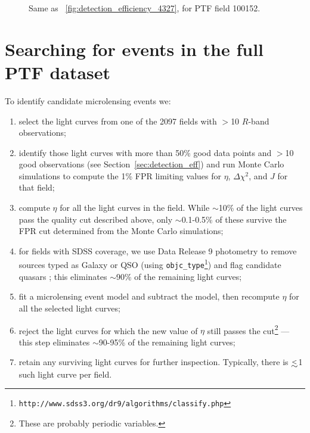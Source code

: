 \documentclass{emulateapj}
\newcommand{\lapprox }{{\lower0.8ex\hbox{$\buildrel <\over\sim$}}}
\begin{document}
\begin{figure}
\centering
	
\caption{Same as \figurename~\ref{fig:detection_efficiency_4327}, for PTF field 100152.}\label{fig:detection_efficiency_100152}
\end{figure}

\section{Searching for events in the full PTF dataset}\label{sec:search}
To identify candidate microlensing events we: %
\begin{enumerate}
	\item select the light curves from one of the 2097 fields with $>$10 $R$-band observations;
	\item identify those light curves with more than 50\% good data points and $>$10 good observations (see Section~\ref{sec:detection_eff}) and run Monte Carlo simulations to compute the 1\% FPR limiting values for $\eta$, $\Delta \chi^2$, and $J$ for that field;
	\item compute $\eta$ for all the light curves in the field. While $\sim$10\% of the light curves pass the quality cut described above, only $\sim$0.1-0.5\% of these survive the FPR cut determined from the Monte Carlo simulations;
	\item for fields with SDSS coverage, we use Data Release 9 photometry \citep{dr9paper} to remove sources typed as Galaxy or QSO (using \texttt{objc\_type}\footnote{{\tt http://www.sdss3.org/dr9/algorithms/classify.php}}) and flag candidate quasars \citep[using the cuts described in][]{richards02}; this eliminates $\sim$90\% of the remaining light curves;
	\item fit a microlensing event model and subtract the model, then recompute $\eta$ for all the selected light curves;
	\item reject the light curves for which the new value of $\eta$ still passes the cut\footnote{These are probably periodic variables.} --- this step eliminates $\sim$90-95\% of the remaining light curves;
	\item retain any surviving light curves for further inspection. Typically, there is $\lapprox$1 such light curve per field.
\end{enumerate}
\end{document}
